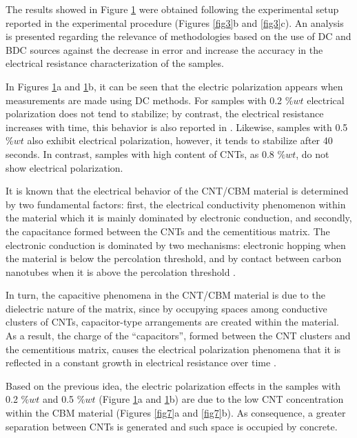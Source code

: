 \documentclass[twocolumn]{bmcart}%
\begin{document}
The results showed in Figure \ref{fig9} were obtained following the experimental setup reported in the experimental procedure (Figures \ref{fig3}b and \ref{fig3}c). An analysis is presented regarding the relevance of methodologies based on the use of DC and BDC sources against the decrease in error and increase the accuracy in the electrical resistance characterization of the samples.

\begin{figure}[h!]
  \caption{
      }
      \label{fig9}
      \end{figure}


 In Figures \ref{fig9}a and \ref{fig9}b, it can be seen that the electric polarization  appears when measurements are made using DC methods. For samples with 0.2 $\%wt$ electrical polarization does not tend to stabilize; by contrast, the electrical resistance increases with time, this behavior is also reported in \cite{Garcia-Macias2017a, Downey2017}. Likewise, samples with 0.5 $\%wt$ also exhibit electrical polarization, however, it tends to stabilize after 40 seconds. In contrast, samples with high content of CNTs, as 0.8 $\%wt$, do not show electrical polarization.

It is known that the electrical behavior of the CNT/CBM material is determined by two fundamental factors: first, the electrical conductivity phenomenon within the material which it is mainly dominated by electronic conduction, and secondly, the capacitance formed between the CNTs and the cementitious matrix. The electronic conduction is dominated by two mechanisms: electronic hopping when the material is below the percolation threshold, and by contact between carbon nanotubes when it is above the percolation threshold \cite{Garcia-Macias2017a, Downey2017}. 

In turn, the capacitive phenomena in the CNT/CBM material is due to the dielectric nature of the matrix, since by occupying spaces among conductive clusters of CNTs, capacitor-type arrangements are created within the material. As a result, the charge of the “capacitors”, formed between the CNT clusters and the cementitious matrix, causes the electrical polarization phenomena that it is reflected in a constant growth in electrical resistance over time \cite{Dong2016}.

Based on the previous idea, the electric polarization effects in the samples with 0.2 $\%wt$ and 0.5 $\%wt$ (Figure \ref{fig9}a and \ref{fig9}b) are due to the low CNT concentration within the CBM material (Figures \ref{fig7}a and \ref{fig7}b). As consequence, a greater separation between CNTs is generated and such space is occupied by concrete.  
\end{document}
